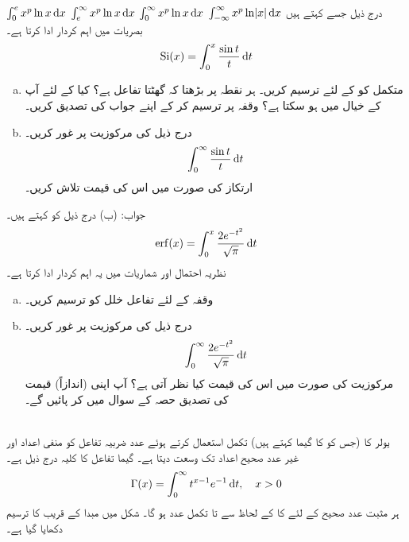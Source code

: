 $\int_0^e x^p\ln x\dif x$
$\int_e^{\infty}x^p\ln x\dif x$
$\int_0^{\infty}x^p\ln x\dif x$
$\int_{-\infty}^{\infty}x^p\ln\abs{x}\dif x$
درج ذیل  جسے  کہتے ہیں بصریات میں اہم کردار ادا کرتا ہے۔
\begin{align*}
\kSi(x)=\int_0^x\frac{\sin t}{t}\dif t
\end{align*}
%
\begin{enumerate}[a.]
\item
متکمل  کو  کے لئے ترسیم کریں۔  ہر نقطہ پر بڑھتا کہ گھٹتا تفاعل ہے؟ کیا  کے لئے آپ کے خیال میں  ہو سکتا ہے؟ وقفہ  پر  ترسیم کر کے اپنے جواب کی تصدیق کریں۔
\item
درج ذیل کی مرکوزیت پر غور کریں۔
\begin{align*}
\int_0^{\infty}\frac{\sin t}{t}\dif t
\end{align*}
ارتکاز کی صورت میں اس کی قیمت تلاش کریں۔
\end{enumerate}
جواب:\quad
(ب) 
درج ذیل کو  کہتے ہیں۔
\begin{align*}
\erf(x)=\int_0^x\frac{2e^{-t^2}}{\sqrt{\pi}}\dif t
\end{align*}
نظریہ احتمال اور شماریات میں یہ اہم کردار ادا کرتا ہے۔
\begin{enumerate}[a.]
\item
وقفہ  کے لئے تفاعل خلل کو ترسیم کریں۔
\item
درج ذیل کی مرکوزیت پر غور کریں۔
\begin{align*}
\int_0^{\infty}\frac{2e^{-t^2}}{\sqrt{\pi}}\dif t
\end{align*}
مرکوزیت کی صورت میں اس کی قیمت کیا نظر آتی ہے؟ آپ اپنی (اندازاً) قیمت کی  تصدیق حصہ  کے سوال  میں کر پائیں گے۔
\end{enumerate}
\\
یولر کا   (جس کو  کا گیما کہتے ہیں) تکمل استعمال کرتے ہوئے عدد ضربیہ تفاعل کو منفی اعداد اور غیر عدد صحیح اعداد تک وسعت دیتا ہے۔ گیما تفاعل کا کلیہ درج ذیل ہے۔
\begin{align*}
\Gamma(x)=\int_0^{\infty}t^{x-1}e^{-1}\dif t,\quad x>0
\end{align*}
ہر مثبت عدد صحیح  کے لئے  کا  کے لحاظ سے  تا  تکمل عدد   ہو گا۔ شکل  میں مبدا کے قریب  کا ترسیم دکھایا گیا ہے۔ 

